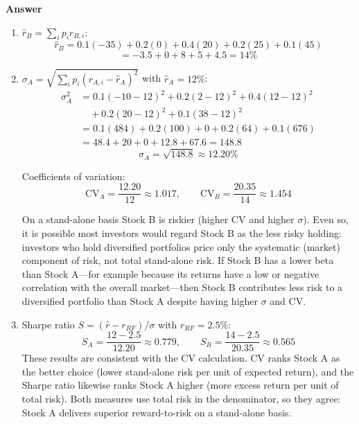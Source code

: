 \documentclass[11pt]{article}
\begin{document}
\bigskip
\textbf{Answer}

\begin{enumerate}
  \item[a.] $\hat{r}_B = \sum_i p_i r_{B,i}$:
    \[
      \hat{r}_B = 0.1(-35) + 0.2(0) + 0.4(20) + 0.2(25) + 0.1(45)
    \]
    \[
      = -3.5 + 0 + 8 + 5 + 4.5 = \boxed{14\%}
    \]

  \item[b.] $\sigma_A = \sqrt{\sum_i p_i(r_{A,i}-\hat{r}_A)^2}$ with $\hat{r}_A=12\%$:
    \begin{align*}
      \sigma_A^2 &= 0.1(-10-12)^2 + 0.2(2-12)^2 + 0.4(12-12)^2\\
                 &\quad + 0.2(20-12)^2 + 0.1(38-12)^2\\
                 &= 0.1(484) + 0.2(100) + 0 + 0.2(64) + 0.1(676)\\
                 &= 48.4 + 20 + 0 + 12.8 + 67.6 = 148.8
    \end{align*}
    \[
      \sigma_A = \sqrt{148.8} \approx \boxed{12.20\%}
    \]

    Coefficients of variation:
    \[
      \text{CV}_A = \frac{12.20}{12} \approx 1.017, \qquad
      \text{CV}_B = \frac{20.35}{14} \approx 1.454
    \]

    On a stand-alone basis Stock B is riskier (higher CV and higher $\sigma$). Even so, it is possible most investors would regard Stock B as the less risky holding: investors who hold diversified portfolios price only the systematic (market) component of risk, not total stand-alone risk. If Stock B has a lower beta than Stock A---for example because its returns have a low or negative correlation with the overall market---then Stock B contributes less risk to a diversified portfolio than Stock A despite having higher $\sigma$ and CV.

  \item[c.] Sharpe ratio $S = (\hat{r}-r_{RF})/\sigma$ with $r_{RF}=2.5\%$:
    \[
      S_A = \frac{12-2.5}{12.20} \approx \boxed{0.779}, \qquad
      S_B = \frac{14-2.5}{20.35} \approx \boxed{0.565}
    \]
    These results are consistent with the CV calculation. CV ranks Stock A as the better choice (lower stand-alone risk per unit of expected return), and the Sharpe ratio likewise ranks Stock A higher (more excess return per unit of total risk). Both measures use total risk in the denominator, so they agree: Stock A delivers superior reward-to-risk on a stand-alone basis.
\end{enumerate}
\end{document}
